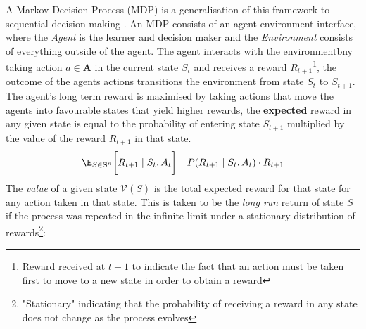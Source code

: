 \begin{center}
\end{center}
A Markov Decision Process (MDP) is a generalisation of this framework to sequential
decision making \cite{sutton2018reinforcement}. An MDP consists of an agent-environment
interface, where the \emph{Agent} is the learner and decision maker and the \emph{Environment}
consists of everything outside of the agent. The agent interacts with the environmentbny taking action $a \in \mathbf{A}$ in the current state $S_t$ and receives a reward $R_{t+1}$\footnote{Reward received at $t+1$ to indicate the fact that 
an action must be taken first to move to a new state in order to obtain a reward}, the outcome of the agents actions
transitions the environment from state $S_t$ to $S_{t+1}$.
The agent's long term reward is maximised by taking actions that move the agents into 
favourable states that yield higher rewards, the \textbf{expected} reward in any given state
is equal to the probability of entering state $S_{t+1}$ multiplied by the value of the reward $R_{t+1}$ in that state.
\begin{equation}
    {\displaystyle \E_{S \in \mathbf{S}^n}\biggl[R_{t+1} \; | \; S_t, A_t \biggl] = 
    P(R_{t+1}\; | \; S_t, A_t)\cdot R_{t+1}}
\end{equation}
The \emph{value} of a given state $\mathcal{V}(S)$ is the total expected reward for that state for any action taken in that state.
This is taken to be the \emph{long run} return of state $S$ if the process was repeated in the infinite limit under a stationary distribution of rewards\footnote{
    "Stationary" indicating that the probability of receiving a reward in any state does not change as the process evolves
}:
